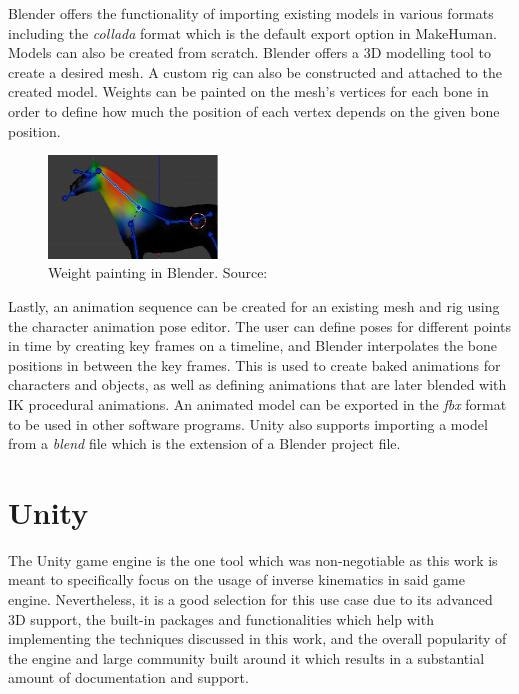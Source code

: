 
Blender offers the functionality of importing existing models in various formats
including the \textit{collada} format \cite{collada} which is the default export
option in MakeHuman. Models can also be created from scratch. Blender offers
a 3D modelling tool to create a desired mesh. A custom rig can also be
constructed and attached to the created model. Weights can be painted on the
mesh's vertices for each bone in order to define how much the position of each vertex
depends on the given bone position. 

\begin{figure}[!h]
    \centering
    \includegraphics[width=0.4\textwidth]{grafika/weight_paint.eps}
    \caption{Weight painting in Blender. Source: \cite{unity_weights}}
    \label{fig:weights}
\end{figure}

Lastly, an animation sequence can be created for an existing mesh and rig using
the character animation pose editor. The user can define poses for different
points in time by creating key frames on a timeline, and Blender interpolates the
bone positions in between the key frames. This is used to create baked animations
for characters and objects, as well as defining animations that are later
blended with IK procedural animations. An animated model can be exported in the
\textit{fbx} format to be used in other software programs. Unity also supports
importing a model from a \textit{blend} file which is the extension of
a Blender project file. 


\section{Unity}
The Unity game engine is the one tool which was non-negotiable as this work
is meant to specifically focus on the usage of inverse kinematics in said game
engine. Nevertheless, it is a good selection for this use case due to its
advanced 3D support, the built-in packages and functionalities which help
with implementing the techniques discussed in this work, and the overall popularity of
the engine and large community built around it which results in a substantial
amount of documentation and support. 

